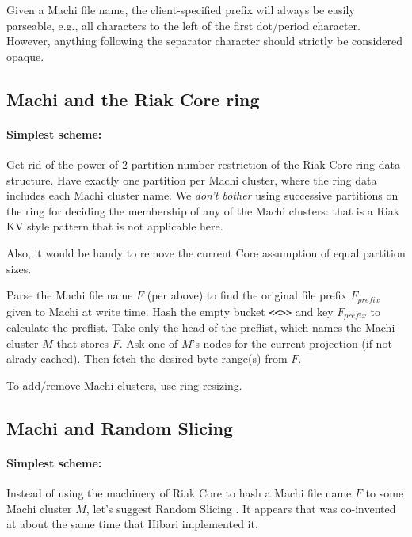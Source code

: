 \documentclass[preprint,10pt]{sigplanconf}
\begin{document}
Given a Machi file name, the client-specified prefix will always be
easily parseable, e.g., all characters to the left of the first
dot/period character.  However, anything following the separator
character should strictly be considered opaque.

\subsection{Machi and the Riak Core ring}
\label{sub:integration-riak-core}

\paragraph{Simplest scheme:}
Get rid of the power-of-2 partition number restriction of the Riak
Core ring data structure.  Have exactly one partition per Machi
cluster, where the ring data includes each Machi cluster name.  We
{\em don't bother} using successive partitions on the ring for
deciding the membership of any of the Machi clusters: that is a Riak KV
style pattern that is not applicable here.

Also, it would be handy to remove the current Core assumption of equal
partition sizes.

Parse the Machi file name $F$ (per above) to find the original
file prefix $F_{prefix}$ given to Machi at write time.
Hash the empty bucket {\tt <<>>} and key $F_{prefix}$ to
calculate the preflist. Take only the head of
the preflist, which names the Machi cluster $M$ that stores $F$.  Ask
one of $M$'s nodes for the current projection (if not alrady cached).
Then fetch the desired byte range(s) from $F$.

To add/remove Machi clusters, use ring resizing.  

\subsection{Machi and Random Slicing}
\label{sub:integration-random-slicing}

\paragraph{Simplest scheme:}
Instead of using the machinery of Riak Core to hash a Machi file name
$F$ to some Machi cluster $M$, let's suggest Random Slicing
\cite{random-slicing}.  It appears that \cite{random-slicing} was
co-invented at about the same time that Hibari
\cite{cr-theory-and-practice} implemented it.
\end{document}
